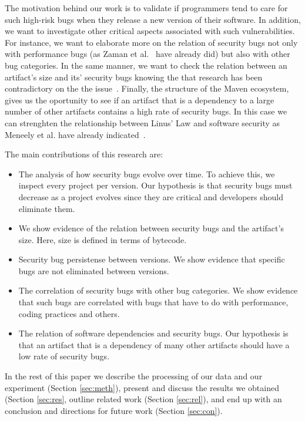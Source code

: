 \documentclass[conference]{IEEEtran}
\begin{document}
The motivation behind our work is to validate if programmers tend to care for
such high-risk bugs when they release a new version of their software. In
addition, we want to investigate other critical aspects associated with such
vulnerabilities. For instance, we want to elaborate more on the relation of security
bugs not only with performance bugs (as Zaman et al.~\cite{ZAH11} have already
did) but also with other bug categories. In the same manner, we want to check
the relation between an artifact's size and its' security bugs knowing the
that research has been contradictory on the the issue~\cite{BP84, SYTP85,
NBZ06, GKMS00}. Finally, the structure of the Maven ecosystem,
gives us the oportunity to see if an artifact that is a dependency to
a large number of other artifacts contains a high rate of security bugs.
In this case we can strenghten the relationship between Linus' Law and
software security as Meneely et al. have already indicated~\cite{MW10}.

The main contributions of this research are:

\begin{itemize}
	\item The analysis of how security bugs evolve over time. To achieve
this, we inspect every project per version. Our hypothesis is that security
bugs must decrease as a project evolves since they are critical and developers
should eliminate them.
	\item We show evidence of the relation between security bugs and the artifact's size.  Here, size is
defined in terms of bytecode.
	\item Security bug persistense between versions. We show evidence that specific bugs are
not eliminated between versions.
	\item The correlation of security bugs with other bug categories. We
show evidence that such bugs are correlated with bugs that have to do with
performance, coding practices and others.
	\item The relation of software dependencies and security bugs. Our
hypothesis is that an artifact that is a dependency of many other artifacts
should have a low rate of security bugs. 
\end{itemize}

In the rest of this paper we
describe the processing of our data and our experiment (Section \ref{sec:meth}),
present and discuss the results we obtained (Section \ref{sec:res},
outline related work (Section \ref{sec:rel}),
and end up with an conclusion and directions for future work (Section \ref{sec:con}).
\end{document}
